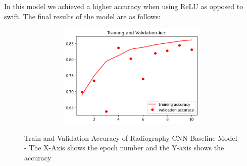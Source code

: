     \begin{table}[H]
    \centering
    \caption{Radiography CNN baseline model hyperparameters}
    \label{tab:Radiography CNN baseline model hyperparameters}
\end{table}
In this model we achieved a higher accuracy when using ReLU as opposed to swift. The final results of the model are as follows:
\begin{table}[H]
    \centering
    \caption{Radiography CNN baseline results}
    \label{tab:Radiography CNN baseline results}
\end{table}
 \begin{figure}[H]
    \centering
    \includegraphics[width=1\textwidth,height=5cm,keepaspectratio]{Images/RadiographyCNNBaselineTrainAndValAcc.png}\\
    \caption{Train and Validation Accuracy of Radiography CNN Baseline Model - The X-Axis shows the epoch number and the Y-axis shows the accuracy}
    \label{fig:Radiography CNN Baseline Train and Validation Accuracy}
\end{figure}
